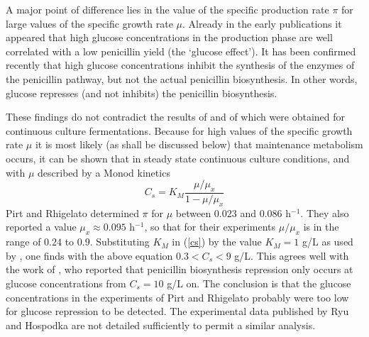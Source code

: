 \documentclass[fist]{svjour3}
\begin{document}
A major
point of difference lies in the value of the specific production rate $\pi$ for
large values of the specific growth rate $\mu$.
Already in the early publications \cite{r1,r2,r3}
it appeared that high glucose
concentrations in the production phase are well correlated with a
low penicillin yield (the
`glucose effect'). It has been confirmed recently
\cite{r1,r2,r3,r4}
that
high glucose concentrations inhibit the synthesis of the enzymes of the
penicillin pathway, but not the actual penicillin biosynthesis.
In other words, glucose represses (and not inhibits) the penicillin
biosynthesis.

These findings do not contradict the results of
\cite{r1}  and of \cite{r4} which were obtained for
continuous culture fermentations.
Because for high values of the specific
growth rate $\mu$ it is most likely (as shall be discussed below) that
maintenance metabolism occurs, it can be shown that
in steady state continuous culture conditions, and with $\mu$ described by a Monod kinetics
\begin{equation}
    C_{s}  =  K_{M} \frac{\mu/\mu_{x}}{1-\mu/\mu_{x}} \label{cs}
\end{equation}
Pirt and Rhigelato determined $\pi$ for $\mu$ between
$0.023$ and $0.086$ h$^{-1}$.
They also reported a value $\mu_{x} \approx 0.095$
h$^{-1}$, so that for their experiments $\mu/\mu_{x}$ is in the range
of $0.24$ to $0.9$.
Substituting $K _M$ in (\ref{cs}) by
the value $K_{M}=1$ g/L as used by \cite{r1}, one finds
with the above equation $0.3 < C_{s} < 9$ g/L. This agrees well with
the work of  \cite{r4}, who reported that penicillin biosynthesis
repression only occurs at glucose concentrations from $C_{s}=10$ g/L on.
The conclusion is that the glucose concentrations in the experiments of
Pirt and Rhigelato probably were too low for glucose repression to be
detected. The experimental data published by Ryu and Hospodka
are not detailed sufficiently to permit a similar analysis.
\end{document}
